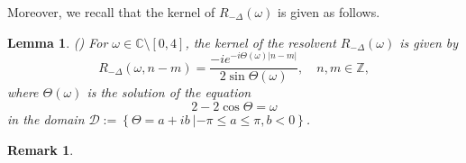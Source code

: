 \documentclass[reqno, 11pt]{amsart}
\newtheorem{lemma}[definition]{Lemma}
\newtheorem{remark}[definition]{Remark}
\newcommand\Z{\mathbb{Z}}
\newcommand\C{\mathbb{C}}
\newcommand\mcaD{\mathcal{D}}
\numberwithin{equation}{section}
\begin{document}
Moreover, we recall that the kernel of $R_{-\Delta}(\omega)$ is given as follows.
\begin{lemma}\label{kernel of lapla}
{\rm(\cite[Lemma 2.1]{KKK06})} For $\omega\in\C\setminus[0,4]$, the kernel of the resolvent $R_{-\Delta}(\omega)$ is given by
\begin{equation}\label{kernel of lapl resolvent}
R_{-\Delta}(\omega,n-m)=\frac{-ie^{-i\Theta(\omega)|n-m|}}{2\sin\Theta(\omega)},\quad n,m\in\Z,
\end{equation}
where $\Theta(\omega)$ is the solution of the equation
\begin{equation}\label{map}
2-2\cos\Theta=\omega
\end{equation}
in the domain $\mcaD:=\left\{\Theta=a+ib~|-\pi\leq a\leq\pi,b<0\right\}$.
\end{lemma}
\begin{remark}
{\rm 

}
\end{remark}
\end{document}
